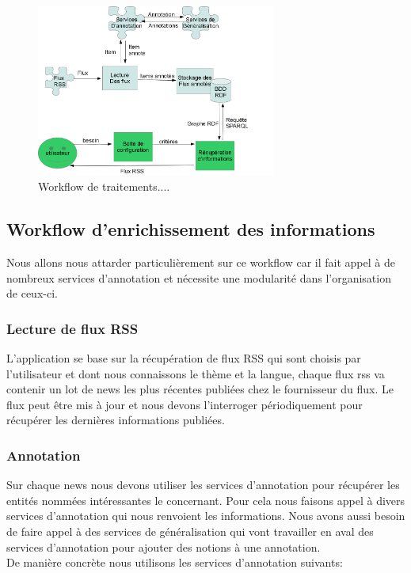 \documentclass[]{easychair}
\begin{document}
\begin{figure}[htb!]
	\begin{centering}
	\includegraphics[width=0.7\textwidth]{diagramme-Archi.png}
	\caption{Workflow de traitements....}
	\label{fig:mmFM}
	\end{centering}
\end{figure}

\subsection{Workflow d'enrichissement des informations}
Nous allons nous attarder particulièrement sur ce workflow car il fait appel à de nombreux services d'annotation et nécessite une modularité dans l'organisation de ceux-ci.

\subsubsection{Lecture de flux RSS}
L'application se base sur la récupération de flux RSS qui sont choisis par l'utilisateur et dont nous connaissons le thème et la langue, chaque flux rss va contenir un lot de news les plus récentes publiées chez le fournisseur du flux. Le flux peut être mis à jour et nous devons l'interroger périodiquement pour récupérer les dernières informations publiées.

\subsubsection{Annotation }
Sur chaque news nous devons utiliser les services d'annotation pour récupérer les entités nommées intéressantes le concernant. Pour cela nous faisons appel à divers services d'annotation qui nous renvoient les informations. Nous avons aussi besoin de faire appel à des services de généralisation qui vont travailler en aval des services d'annotation pour ajouter des notions à une annotation.\\
De manière concrète nous utilisons les services d'annotation suivants:
\end{document}
